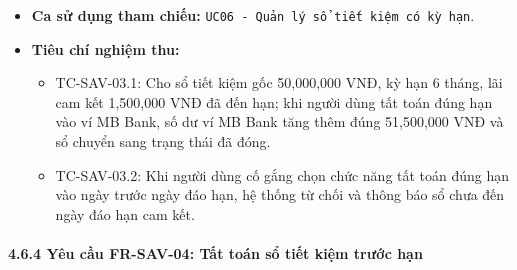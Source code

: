\documentclass[11pt,a4paper]{article}
\providecommand{\tightlist}{
  \setlength{\itemsep}{0pt}\setlength{\parskip}{0pt}}
\begin{document}
\begin{itemize}
  \begin{itemize}
  \tightlist
  \item
    Số dư ví nhận tiền tăng thêm đúng bằng số tiền Payout (Gốc + Lãi cam
    kết).
  \item
    Trạng thái sổ tiết kiệm chuyển thành \texttt{SETTLED\_MATURED}.
  \item
    Thông báo tất toán đúng hạn thành công kèm chi tiết số tiền gốc và
    lãi đã nhận.
  \end{itemize}
\item
  \textbf{Ca sử dụng tham chiếu:}
  \texttt{UC06\ -\ Quản\ lý\ sổ\ tiết\ kiệm\ có\ kỳ\ hạn}.
\item
  \textbf{Tiêu chí nghiệm thu:}

  \begin{itemize}
  \tightlist
  \item
    TC-SAV-03.1: Cho sổ tiết kiệm gốc 50,000,000 VNĐ, kỳ hạn 6 tháng,
    lãi cam kết 1,500,000 VNĐ đã đến hạn; khi người dùng tất toán đúng
    hạn vào ví MB Bank, số dư ví MB Bank tăng thêm đúng 51,500,000 VNĐ
    và sổ chuyển sang trạng thái đã đóng.
  \item
    TC-SAV-03.2: Khi người dùng cố gắng chọn chức năng tất toán đúng hạn
    vào ngày trước ngày đáo hạn, hệ thống từ chối và thông báo sổ chưa
    đến ngày đáo hạn cam kết.
  \end{itemize}
\end{itemize}

\newpage

\paragraph{4.6.4 Yêu cầu FR-SAV-04: Tất toán sổ tiết kiệm trước
hạn}\label{464-yuxeau-cux1ea7u-fr-sav-04-tux1ea5t-touxe1n-sux1ed5-tiux1ebft-kiux1ec7m-trux1b0ux1edbc-hux1ea1n}
\end{document}
